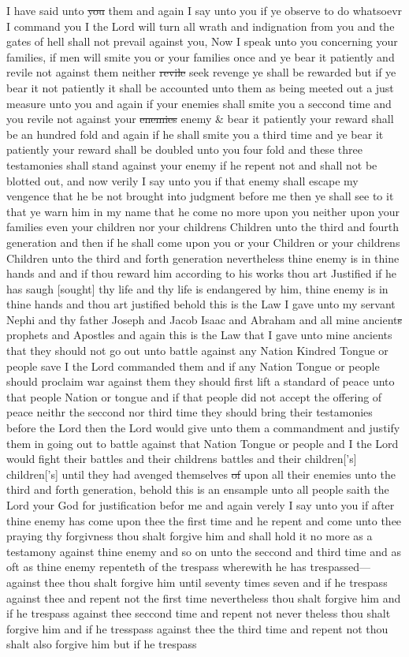 I have said unto \sout{you} them and again I say unto you if ye observe to do whatsoevr I command you I the Lord will turn all wrath and indignation from you and the gates of hell shall not prevail against you, Now I speak unto you concerning your families, if men will smite you or your families once and ye bear it patiently and revile not against them neither \sout{revile} seek revenge ye shall be rewarded but if ye bear it not patiently it shall be accounted unto them as being meeted out a just measure unto you and again if your enemies shall smite you a seccond time and you revile not against your \sout{enemies} enemy \& bear it patiently your reward shall be an hundred fold and again if he shall smite you a third time and ye bear it patiently your reward shall be doubled unto you four fold and these three testamonies shall stand against your enemy if he repent not and shall not be blotted out, and now verily I say unto you if that enemy shall escape my vengence that he be not brought into judgment before me then ye shall see to it that ye warn him in my name that he come no more upon you neither upon your families even your children nor your childrens Children unto the third and fourth generation and then if he shall come upon you or your Children or your childrens Children unto the third and forth generation nevertheless thine enemy is in thine hands and and if thou reward him according to his works thou art Justified if he has saugh [sought] thy life and thy life is endangered by him, thine enemy is in thine hands and thou art justified behold this is the Law I gave unto my servant Nephi and thy father Joseph and Jacob Isaac and Abraham and all mine ancient\sout{s} prophets and Apostles and again this is the Law that I gave unto mine ancients that they should not go out unto battle against any Nation Kindred Tongue or people save I the Lord commanded them and if any Nation Tongue or people should proclaim war against them they should first lift a standard of peace unto that people Nation or tongue and if that people did not accept the offering of peace neithr the seccond nor third time they should bring their testamonies before the Lord then the Lord would give unto them a commandment and justify them in going out to battle against that Nation Tongue or people and I the Lord would fight their battles and their childrens battles and their children['s] children['s] until they had avenged themselves \sout{of} upon all their enemies unto the third and forth generation, behold this is an ensample unto all people saith the Lord your God for justification befor me and again verely I say unto you if after thine enemy has come upon thee the first time and he repent and come unto thee praying thy forgivness thou shalt forgive him and shall hold it no more as a testamony against thine enemy and so on unto the seccond and third time and as oft as thine enemy repenteth of the trespass wherewith he has trespassed--- against thee thou shalt forgive him until seventy times seven and if he trespass against thee and repent not the first time nevertheless thou shalt forgive him and if he trespass against thee seccond time and repent not never theless thou shalt forgive him and if he tresspass against thee the third time and repent not thou shalt also forgive him but if he trespass 
